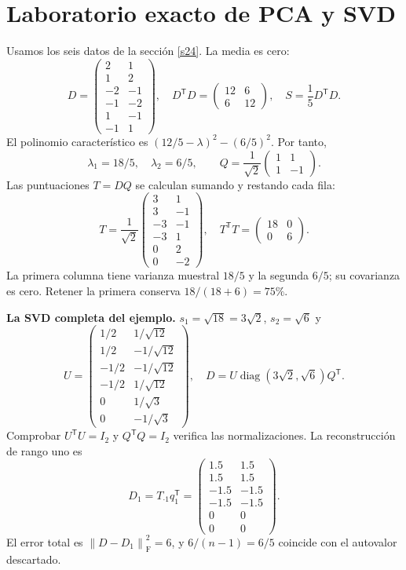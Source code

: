\documentclass[11pt,a4paper]{article}
\newcommand{\T}{^{\mathsf T}}
\newcommand{\norm}[1]{\left\lVert #1\right\rVert}
\DeclareMathOperator{\diag}{diag}
\newcommand{\F}{_{\mathrm F}}
\newcommand{\topic}[2]{\clearpage\section{#1}\label{#2}}
\theoremstyle{definition}\newtheorem{definicion}[teorema]{Definición}
\begin{document}
\topic{Laboratorio exacto de PCA y SVD}{s30}
Usamos los seis datos de la sección \ref{s24}. La media es cero:
\[
D=\begin{pmatrix}2&1\\1&2\\-2&-1\\-1&-2\\1&-1\\-1&1\end{pmatrix},
\quad D\T D=\begin{pmatrix}12&6\\6&12\end{pmatrix},
\quad S=\frac15D\T D.
\]
El polinomio característico es
$(12/5-\lambda)^2-(6/5)^2$.
Por tanto,
\[
\lambda_1=18/5,\quad \lambda_2=6/5,\qquad
Q=\frac1{\sqrt2}\begin{pmatrix}1&1\\1&-1\end{pmatrix}.
\]
Las puntuaciones $T=DQ$ se calculan sumando y restando cada fila:
\[
T=\frac1{\sqrt2}
\begin{pmatrix}3&1\\3&-1\\-3&-1\\-3&1\\0&2\\0&-2\end{pmatrix},
\quad T\T T=\begin{pmatrix}18&0\\0&6\end{pmatrix}.
\]
La primera columna tiene varianza muestral $18/5$ y la segunda $6/5$;
su covarianza es cero. Retener la primera conserva $18/(18+6)=75\%$.

\textbf{La SVD completa del ejemplo.}
$s_1=\sqrt{18}=3\sqrt2$, $s_2=\sqrt6$ y
\[
U=\begin{pmatrix}
1/2&1/\sqrt{12}\\1/2&-1/\sqrt{12}\\
-1/2&-1/\sqrt{12}\\-1/2&1/\sqrt{12}\\
0&1/\sqrt3\\0&-1/\sqrt3
\end{pmatrix},\quad
D=U\diag(3\sqrt2,\sqrt6)Q\T.
\]
Comprobar $U\T U=I_2$ y $Q\T Q=I_2$ verifica las normalizaciones.
La reconstrucción de rango uno es
\[
D_1=T_{\cdot1}q_1\T
=\begin{pmatrix}1.5&1.5\\1.5&1.5\\-1.5&-1.5\\-1.5&-1.5\\0&0\\0&0\end{pmatrix}.
\]
El error total es $\norm{D-D_1}\F^2=6$, y $6/(n-1)=6/5$
coincide con el autovalor descartado.
\end{document}
